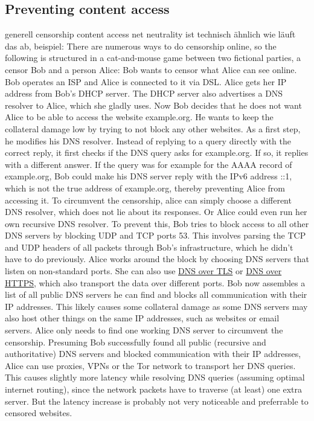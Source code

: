 \subsection{Preventing content access}
generell censorship
content access
net neutrality
ist technisch ähnlich
wie läuft das ab, beispiel:
There are numerous ways to do censorship online, so the following is structured in a cat-and-mouse game between two fictional parties, a censor Bob and a person Alice:
Bob wants to censor what Alice can see online.
Bob operates an ISP and Alice is connected to it via DSL. Alice gets her IP address from Bob's DHCP server.
The DHCP server also advertises a DNS resolver to Alice, which she gladly uses.
Now Bob decides that he does not want Alice to be able to access the website example.org.
He wants to keep the collateral damage low by trying to not block any other websites.
As a first step, he modifies his DNS resolver.
Instead of replying to a query directly with the correct reply, it first checks if the DNS query asks for example.org.
If so, it replies with a different answer.
If the query was for example for the AAAA record of example.org, Bob could make his DNS server reply with the IPv6 address ::1, which is not the true address of example.org, thereby preventing Alice from accessing it.
To circumvent the censorship, alice can simply choose a different DNS resolver, which does not lie about its responses.
Or Alice could even run her own recursive DNS resolver.
To prevent this, Bob tries to block access to all other DNS servers by blocking UDP and TCP ports 53.
This involves parsing the TCP and UDP headers of all packets through Bob's infrastructure, which he didn't have to do previously.
Alice works around the block by choosing DNS servers that listen on non-standard ports. She can also use \href{https://en.wikipedia.org/wiki/DNS_over_TLS}{DNS over TLS} or \href{https://en.wikipedia.org/wiki/DNS_over_HTTPS}{DNS over HTTPS}, which also transport the data over different ports.
Bob now assembles a list of all public DNS servers he can find and blocks all communication with their IP addresses.
This likely causes some collateral damage as some DNS servers may also host other things on the same IP addresses, such as websites or email servers.
Alice only needs to find one working DNS server to circumvent the censorship.
Presuming Bob successfully found all public (recursive and authoritative) DNS servers and blocked communication with their IP addresses, Alice can use proxies, VPNs or the Tor network to transport her DNS queries.
This causes slightly more latency while resolving DNS queries (assuming optimal internet routing), since the network packets have to traverse (at least) one extra server.
But the latency increase is probably not very noticeable and preferrable to censored websites.



